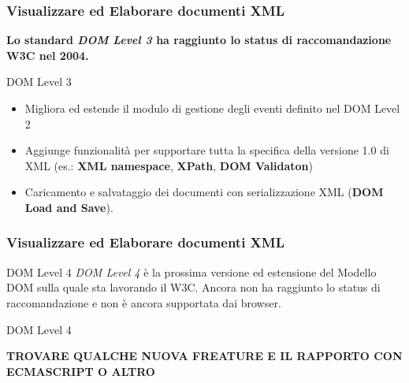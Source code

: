 \begin{frame}
    \frametitle{Visualizzare ed Elaborare documenti XML}
    \addtocounter{nframe}{1}
    

     
      \textbf{Lo standard \textit{DOM Level 3} ha raggiunto lo status di raccomandazione W3C nel 2004.}
     

     \begin{block}{DOM Level 3}
        \begin{itemize}
            \item Migliora ed estende il modulo di gestione degli eventi definito nel DOM Level 2
            \item Aggiunge funzionalità per supportare tutta la specifica della versione 1.0 di XML (es.: \textbf{XML namespace}, \textbf{XPath}, \textbf{DOM Validaton})
            \item Caricamento e salvataggio dei documenti con serializzazione XML (\textbf{DOM Load and Save}).
        \end{itemize}
       
      \end{block}

\end{frame}


\begin{frame}
    \frametitle{Visualizzare ed Elaborare documenti XML}
    \addtocounter{nframe}{1}
    

     \begin{block}{DOM Level 4}
     \textit{DOM Level 4} è la prossima versione ed estensione del Modello DOM sulla quale sta lavorando il W3C. Ancora non ha raggiunto lo status di raccomandazione e non è ancora supportata dai browser. 
     \end{block}
     

     \begin{block}{DOM Level 4}
       
        \textbf{TROVARE QUALCHE NUOVA FREATURE E IL RAPPORTO CON ECMASCRIPT O ALTRO}
       
      \end{block}

\end{frame}

